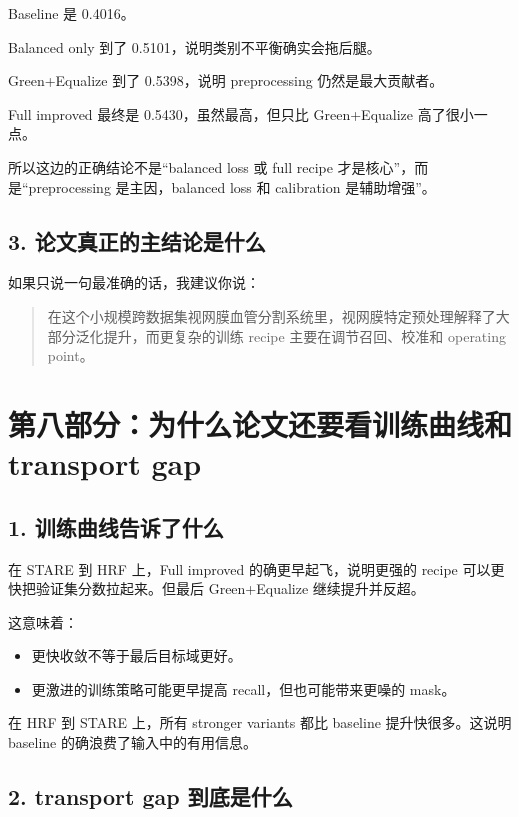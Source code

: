 \documentclass[12pt,a4paper]{ctexart}
\begin{document}
Baseline 是 0.4016。

Balanced only 到了 0.5101，说明类别不平衡确实会拖后腿。

Green+Equalize 到了 0.5398，说明 preprocessing 仍然是最大贡献者。

Full improved 最终是 0.5430，虽然最高，但只比 Green+Equalize 高了很小一点。

所以这边的正确结论不是“balanced loss 或 full recipe 才是核心”，而是“preprocessing 是主因，balanced loss 和 calibration 是辅助增强”。

\subsection*{3. 论文真正的主结论是什么}

如果只说一句最准确的话，我建议你说：

\begin{quote}
在这个小规模跨数据集视网膜血管分割系统里，视网膜特定预处理解释了大部分泛化提升，而更复杂的训练 recipe 主要在调节召回、校准和 operating point。
\end{quote}

\section*{第八部分：为什么论文还要看训练曲线和 transport gap}

\subsection*{1. 训练曲线告诉了什么}

在 STARE 到 HRF 上，Full improved 的确更早起飞，说明更强的 recipe 可以更快把验证集分数拉起来。但最后 Green+Equalize 继续提升并反超。

这意味着：

\begin{itemize}[leftmargin=1.6em]
  \item 更快收敛不等于最后目标域更好。
  \item 更激进的训练策略可能更早提高 recall，但也可能带来更噪的 mask。
\end{itemize}

在 HRF 到 STARE 上，所有 stronger variants 都比 baseline 提升快很多。这说明 baseline 的确浪费了输入中的有用信息。

\subsection*{2. transport gap 到底是什么}
\end{document}
